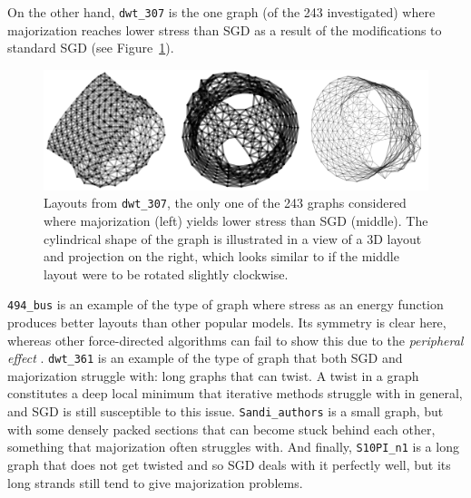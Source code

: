 On the other hand, \texttt{dwt\_307} is the one graph (of the 243 investigated) where majorization reaches lower stress than SGD as a result of the modifications to standard SGD (see Figure~\ref{fig:cylinder}).

\begin{figure}
  \centering
  \includegraphics[width=1\textwidth]{stress/dwt_307.png}
  \caption[The one graph in the test set where majorization performs better]{Layouts from \texttt{dwt\_307}, the only one of the 243 graphs considered where majorization (left) yields lower stress than SGD (middle). The cylindrical shape of the graph is illustrated in a view of a 3D layout and projection on the right, which looks similar to if the middle layout were to be rotated slightly clockwise.
  }
  \label{fig:cylinder}
\end{figure}

\texttt{494\_bus} is an example of the type of graph where stress as an energy function produces better layouts than other popular models. Its symmetry is clear here, whereas other force-directed algorithms can fail to show this due to the \emph{peripheral effect} \cite{Hu2005}.
\texttt{dwt\_361} is an example of the type of graph that both SGD and majorization struggle with: long graphs that can twist. A twist in a graph constitutes a deep local minimum that iterative methods struggle with in general, and SGD is still susceptible to this issue.
\texttt{Sandi\_authors} is a small graph, but with some densely packed sections that can become stuck behind each other, something that majorization often struggles with.
And finally, \texttt{S10PI\_n1} is a long graph that does not get twisted and so SGD deals with it perfectly well, but its long strands still tend to give majorization problems.

